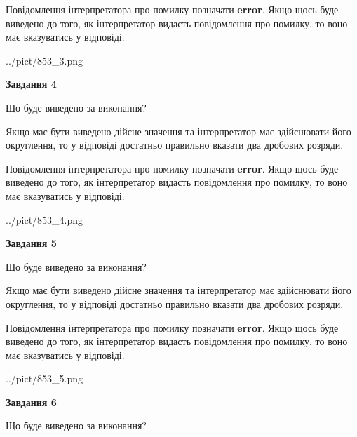 \documentclass[12pt, ukrainian]{article}
\begin{document}
{\begin {Large}
Повідомлення інтерпретатора про помилку позначати \textbf{error}.
Якщо щось буде виведено до того, як інтерпретатор видасть повідомлення про помилку, 
то воно має вказуватись у відповіді. \par

\begin{center}
	{../pict/853_3.png}
\end{center}
\newpage

{\begin {center}\textbf{Завдання 4}\end {center}}\par
Що буде виведено за виконання? \par

Якщо має бути виведено дійсне значення та інтерпретатор має здійснювати його округлення, 
то у відповіді достатньо правильно вказати два дробових розряди.

Повідомлення інтерпретатора про помилку позначати \textbf{error}.
Якщо щось буде виведено до того, як інтерпретатор видасть повідомлення про помилку, 
то воно має вказуватись у відповіді. \par

\begin{center}
	{../pict/853_4.png}
\end{center}
\newpage

{\begin {center}\textbf{Завдання 5}\end {center}}\par
Що буде виведено за виконання? \par

Якщо має бути виведено дійсне значення та інтерпретатор має здійснювати його округлення, 
то у відповіді достатньо правильно вказати два дробових розряди.

Повідомлення інтерпретатора про помилку позначати \textbf{error}.
Якщо щось буде виведено до того, як інтерпретатор видасть повідомлення про помилку, 
то воно має вказуватись у відповіді. \par

\begin{center}
	{../pict/853_5.png}
\end{center}
\newpage

{\begin {center}\textbf{Завдання 6}\end {center}}\par
Що буде виведено за виконання? \par


\end{Large}}
\end{document}
